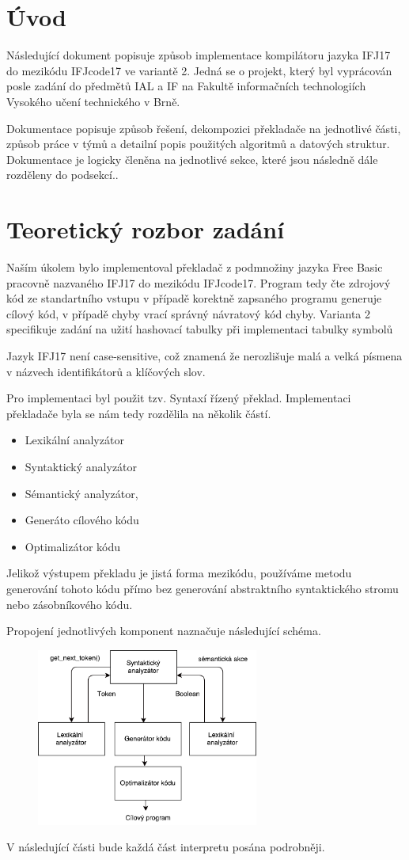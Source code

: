 \section{Úvod}
Následující dokument popisuje způsob implementace kompilátoru jazyka IFJ17 do mezikódu
IFJcode17 ve variantě 2. Jedná se o projekt,
který byl vyprácován posle zadání do předmětů IAL a IF na Fakultě
informačních technologiích Vysokého učení technického v Brně.

Dokumentace popisuje způsob řešení, dekompozici překladače na jednotlivé části,
způsob práce v týmů a detailní popis použitých algoritmů a datových struktur. Dokumentace je logicky členěna na
jednotlivé sekce, které jsou následně dále rozděleny do podsekcí..

\section{Teoretický rozbor zadání}
Naším úkolem bylo implementoval překladač z podmnožiny jazyka Free Basic pracovně nazvaného
IFJ17 do mezikódu IFJcode17. Program tedy čte zdrojový kód ze standartního vstupu v případě korektně zapsaného
programu generuje cílový kód, v případě chyby vrací správný návratový kód chyby.
Varianta 2 specifikuje zadání na užití hashovací tabulky při implementaci tabulky symbolů

Jazyk IFJ17 není case-sensitive, což znamená že nerozlišuje malá a velká
písmena v názvech identifikátorů a klíčových slov.

Pro implementaci byl použit tzv. Syntaxí řízený překlad.
Implementaci překladače byla se nám tedy rozdělila na několik částí.

\begin{itemize}
    \item Lexikální analyzátor
    \item Syntaktický analyzátor
    \item Sémantický analyzátor,
    \item Generáto cílového kódu
    \item Optimalizátor kódu
\end{itemize}

Jelikož výstupem překladu je jistá forma mezikódu, používáme metodu generování tohoto kódu přímo bez generování
abstraktního syntaktického stromu nebo zásobníkového kódu.

Propojení jednotlivých komponent naznačuje následující schéma.
\vspace*{16px}
\begin{figure}[htbp]
\centering
\includegraphics[width=0.65\textwidth, angle=0]{src/assets/structure.pdf}
\end{figure}

V následující části bude každá část interpretu posána podrobněji.